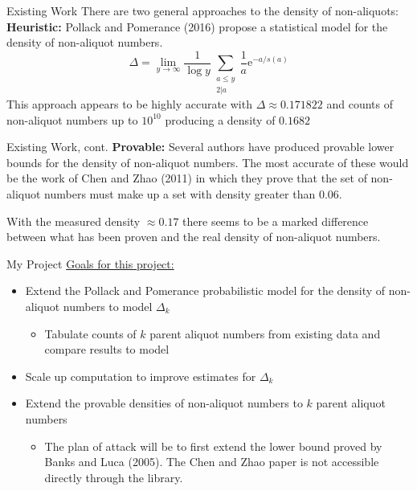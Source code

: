 \documentclass{beamer}
\begin{document}
\begin{frame}{Existing Work}
    There are two general approaches to the density of non-aliquots:\linebreak\linebreak
    \textbf{Heuristic:}\linebreak
    Pollack and Pomerance (2016) propose a statistical model for the density of non-aliquot numbers. $$\Delta = \lim_{y \to \infty}\frac{1}{\log y} \sum_{\substack{a\leq y \\ 2 | a}} \frac{1}{a}\text{e}^{-a/s(a)}$$
    This approach appears to be highly accurate with $\Delta \approx 0.171822$ and counts of non-aliquot numbers up to $10^{10}$ producing a density of $0.1682$
\end{frame}

\begin{frame}{Existing Work, cont.}
    \textbf{Provable:} \linebreak
    Several authors have produced provable lower bounds for the density of non-aliquot numbers. The most accurate of these would be the work of Chen and Zhao (2011) in which they prove that the set of non-aliquot numbers must make up a set with density greater than \underline{$0.06$}. \linebreak
    
    With the measured density $\approx 0.17$ there seems to be a marked difference between what has been proven and the real density of non-aliquot numbers.
\end{frame}

\begin{frame}{My Project}
    \underline{Goals for this project:} \begin{itemize}
        \item Extend the Pollack and Pomerance probabilistic model for the density of non-aliquot numbers to model $\Delta_k$
        \begin{itemize}
            \item Tabulate counts of $k$ parent aliquot numbers from existing data and compare results to model 
        \end{itemize}
        \item Scale up computation to improve estimates for $\Delta_k$ 
        \item Extend the provable densities of non-aliquot numbers to $k$ parent aliquot numbers
        \begin{itemize}
            \item The plan of attack will be to first extend the lower bound proved by Banks and Luca (2005). The Chen and Zhao paper is not accessible directly through the library. 
        \end{itemize}
    \end{itemize}
\end{frame}
\end{document}
